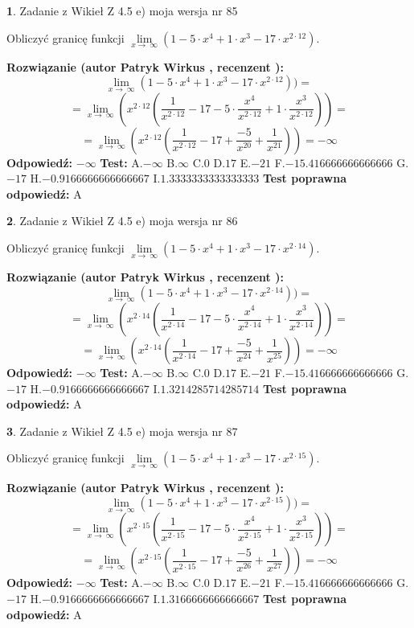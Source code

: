 \documentclass[12pt, a4paper]{article}
\theoremstyle{definition} %
\newtheorem{zad}{}
\newcommand{\zadStart}[1]{\begin{zad}#1\newline}
\newcommand{\zadStop}{\end{zad}}
\newcommand{\rozwStart}[2]{\noindent \textbf{Rozwiązanie (autor #1 , recenzent #2): }\newline}
\newcommand{\rozwStop}{\newline}
\newcommand{\odpStart}{\noindent \textbf{Odpowiedź:}\newline}
\newcommand{\odpStop}{\newline}
\newcommand{\testStart}{\noindent \textbf{Test:}\newline}
\newcommand{\testStop}{\newline}
\newcommand{\kluczStart}{\noindent \textbf{Test poprawna odpowiedź:}\newline}
\newcommand{\kluczStop}{\newline}
\begin{document}
\zadStart{Zadanie z Wikieł Z 4.5 e) moja wersja nr 85}


Obliczyć granicę funkcji  $\lim\limits_{x\to\ \infty}(1 - 5 \cdot x^{4}+1 \cdot x^{3}- 17 \cdot x^{2\cdot12})$.
\zadStop
\rozwStart{Patryk Wirkus}{}
$$\lim\limits_{x\to\ \infty}(1 - 5 \cdot x^{4}+1 \cdot x^{3}- 17 \cdot x^{2\cdot12}))=$$
$$=\lim\limits_{x\to\ \infty}(x^{2\cdot12}(\frac{1}{x^{2\cdot12}}-17 -5 \cdot \frac{x^{4}}{x^{2\cdot12}}+1 \cdot \frac{x^{3}}{x^{2\cdot12}}))=$$
$$=\lim\limits_{x\to\ \infty}(x^{2\cdot12}(\frac{1}{x^{2\cdot12}}-17 + \frac{-5}{x^{20}}+ \frac{1}{x^{21}}))=-\infty$$
\rozwStop
\odpStart
$-\infty$
\odpStop
\testStart
A.$-\infty$ B.$\infty$ C.$0$ D.$17$ E.$-21$
F.$-15.416666666666666$ G.$-17$
H.$-0.9166666666666667$
I.$1.3333333333333333$
\testStop
\kluczStart
A
\kluczStop



\zadStart{Zadanie z Wikieł Z 4.5 e) moja wersja nr 86}


Obliczyć granicę funkcji  $\lim\limits_{x\to\ \infty}(1 - 5 \cdot x^{4}+1 \cdot x^{3}- 17 \cdot x^{2\cdot14})$.
\zadStop
\rozwStart{Patryk Wirkus}{}
$$\lim\limits_{x\to\ \infty}(1 - 5 \cdot x^{4}+1 \cdot x^{3}- 17 \cdot x^{2\cdot14}))=$$
$$=\lim\limits_{x\to\ \infty}(x^{2\cdot14}(\frac{1}{x^{2\cdot14}}-17 -5 \cdot \frac{x^{4}}{x^{2\cdot14}}+1 \cdot \frac{x^{3}}{x^{2\cdot14}}))=$$
$$=\lim\limits_{x\to\ \infty}(x^{2\cdot14}(\frac{1}{x^{2\cdot14}}-17 + \frac{-5}{x^{24}}+ \frac{1}{x^{25}}))=-\infty$$
\rozwStop
\odpStart
$-\infty$
\odpStop
\testStart
A.$-\infty$ B.$\infty$ C.$0$ D.$17$ E.$-21$
F.$-15.416666666666666$ G.$-17$
H.$-0.9166666666666667$
I.$1.3214285714285714$
\testStop
\kluczStart
A
\kluczStop



\zadStart{Zadanie z Wikieł Z 4.5 e) moja wersja nr 87}


Obliczyć granicę funkcji  $\lim\limits_{x\to\ \infty}(1 - 5 \cdot x^{4}+1 \cdot x^{3}- 17 \cdot x^{2\cdot15})$.
\zadStop
\rozwStart{Patryk Wirkus}{}
$$\lim\limits_{x\to\ \infty}(1 - 5 \cdot x^{4}+1 \cdot x^{3}- 17 \cdot x^{2\cdot15}))=$$
$$=\lim\limits_{x\to\ \infty}(x^{2\cdot15}(\frac{1}{x^{2\cdot15}}-17 -5 \cdot \frac{x^{4}}{x^{2\cdot15}}+1 \cdot \frac{x^{3}}{x^{2\cdot15}}))=$$
$$=\lim\limits_{x\to\ \infty}(x^{2\cdot15}(\frac{1}{x^{2\cdot15}}-17 + \frac{-5}{x^{26}}+ \frac{1}{x^{27}}))=-\infty$$
\rozwStop
\odpStart
$-\infty$
\odpStop
\testStart
A.$-\infty$ B.$\infty$ C.$0$ D.$17$ E.$-21$
F.$-15.416666666666666$ G.$-17$
H.$-0.9166666666666667$
I.$1.3166666666666667$
\testStop
\kluczStart
A
\kluczStop
\end{document}

